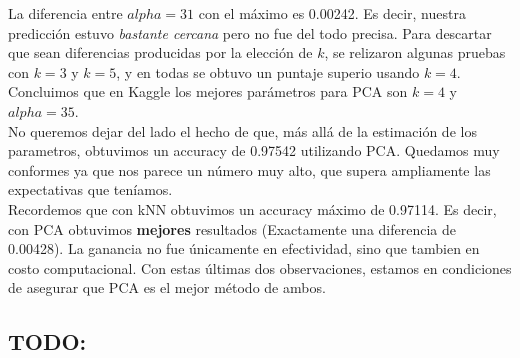 La diferencia entre $alpha=31$ con el máximo es 0.00242. Es decir, nuestra predicción estuvo \textit{bastante cercana} pero no fue del todo precisa. Para descartar que sean diferencias producidas por la elección de $k$, se relizaron algunas pruebas con $k=3$ y $k=5$, y en todas se obtuvo un puntaje superio usando $k=4$. Concluimos que en Kaggle los mejores parámetros para PCA son $k=4$ y $alpha=35$.  \\

No queremos dejar del lado el hecho de que, más allá de la estimación de los parametros, obtuvimos un accuracy de 0.97542 utilizando PCA. Quedamos muy conformes ya que nos parece un número muy alto, que supera ampliamente las expectativas que teníamos. \\

Recordemos que con kNN obtuvimos un accuracy máximo de 0.97114. Es decir, con PCA obtuvimos \textbf{mejores} resultados (Exactamente una diferencia de 0.00428). La ganancia no fue únicamente en efectividad, sino que tambien en costo computacional. Con estas últimas dos observaciones, estamos en condiciones de asegurar que PCA es el mejor método de ambos. \\


\subsection{TODO:}



